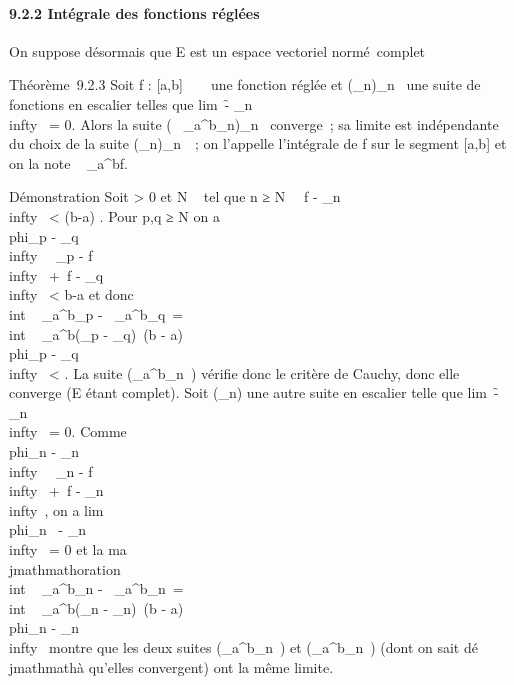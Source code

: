 \documentclass[]{article}
\begin{document}
\paragraph{9.2.2 Intégrale des fonctions réglées}

On suppose désormais que E est un espace vectoriel normé~complet

Théorème~9.2.3 Soit f : {[}a,b{]} \rightarrow~ ~ une fonction réglée et
(\phi_n)_n\in{}~ une suite de fonctions en escalier telles
que lim~\f -
\phi_n\\infty~ = 0. Alors la suite
\left (\int ~
_a^b\phi_n\right )_n\in{}~
converge~; sa limite est indépendante du choix de la suite
(\phi_n)_n\in{}~~; on l'appelle l'intégrale de f sur le
segment {[}a,b{]} et on la note \int ~
_a^bf.

Démonstration Soit \epsilon \textgreater{} 0 et N \in {}~ tel que n ≥ N
\rigtharrow~\ f - \phi_n\\infty~
\textless{} \epsilon {}(b-a) . Pour p,q ≥ N on a
\\phi_p -
\phi_q\\infty~ \leq\
\phi_p - f\\infty~ +\
f - \phi_q\\infty~ \textless{} \epsilon
\over b-a et donc
\\int ~
_a^b\phi_p -\int ~
_a^b\phi_q\
=\\int ~
_a^b(\phi_p -
\phi_q)\ \leq (b -
a)\\phi_p -
\phi_q\\infty~ \textless{} \epsilon. La suite
(\int  _a^b\phi_n~) vérifie
donc le critère de Cauchy, donc elle converge (E étant complet). Soit
(\psi_n) une autre suite en escalier telle que
lim~\f -
\psi_n\\infty~ = 0. Comme
\\phi_n -
\psi_n\\infty~ \leq\
\phi_n - f\\infty~ +\
f - \psi_n\\infty~, on a
lim\\phi_n~ -
\psi_n\\infty~ = 0 et la ma\\jmathmathoration
\\int ~
_a^b\phi_n -\int ~
_a^b\psi_n\
=\\int ~
_a^b(\phi_n -
\psi_n)\ \leq (b -
a)\\phi_n -
\psi_n\\infty~ montre que les deux suites
(\int  _a^b\phi_n~) et
(\int  _a^b\psi_n~) (dont on
sait dé\\jmathmathà qu'elles convergent) ont la même limite.
\end{document}
